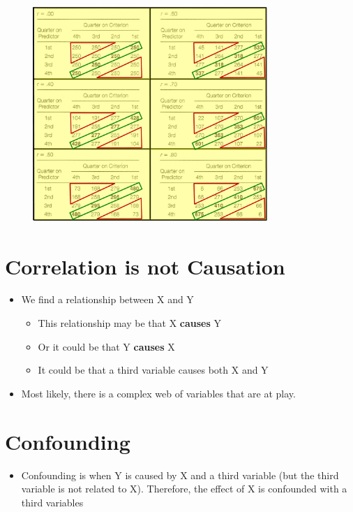 \documentclass[12pt]{article}
\begin{document}
\begin{figure}[H]
\centering
\includegraphics[width=3.5in]{corr_predaccur.png}
\caption{}
\end{figure}

\section{Correlation is not
Causation}\label{correlation-is-not-causation}

\begin{itemize}
\itemsep1pt\parskip0pt
\item
  We find a relationship between X and Y

  \begin{itemize}
  \itemsep1pt\parskip0pt
  \item
    This relationship may be that X \textbf{causes} Y
  \item
    Or it could be that Y \textbf{causes} X
  \item
    It could be that a third variable causes both X and Y
  \end{itemize}
\item
  Most likely, there is a complex web of variables that are at play.
\end{itemize}

\section{Confounding}\label{confounding}

\begin{itemize}
\itemsep1pt\parskip0pt
\item
  Confounding is when Y is caused by X and a third variable (but the
  third variable is not related to X). Therefore, the effect of X is
  confounded with a third variables
\end{itemize}
\end{document}
